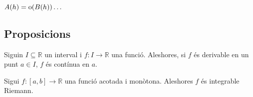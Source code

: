 \documentclass[../Apunts.tex]{subfiles}
\begin{document}
	\begin{definition}[Derivada]
		\label{def:derivada}
	\end{definition}
	\begin{definition}
		\label{def:Landau}
		\(A(h)=\operatorname{o}(B(h))\dots\)
	\end{definition}
	\subsection{Proposicions}
	\begin{proposition}\label{prop:Derivable implica contínua}
		Siguin \(I\subseteq\mathbb{R}\) un interval i \(f\colon I\to\mathbb{R}\) una funció. Aleshores, si \(f\) és derivable en un punt \(a\in I\), \(f\) és contínua en \(a\).
	\end{proposition}
	\begin{proposition}
		Sigui \(f\colon[a,b]\to\mathbb{R}\) una funció acotada i monòtona. Aleshores \(f\) és integrable Riemann.
	\end{proposition}
\end{document}
